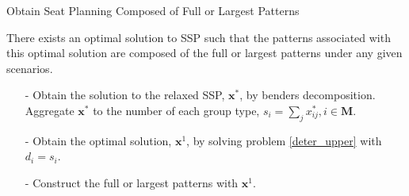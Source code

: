 \begin{frame}{Obtain Seat Planning Composed of Full or Largest Patterns}

  There exists an optimal solution to SSP such that the patterns associated with this optimal solution are composed of the full or largest patterns under any given scenarios.

  \begin{itemize}
    \item[-] Obtain the solution to the relaxed SSP, $\mathbf{x}^{*}$, by benders decomposition. Aggregate $\mathbf{x}^{*}$ to the number of each group type, ${s}_{i} =\sum_{j} x^{*}_{ij}, i \in \mathbf{M}$.

    \item[-] Obtain the optimal solution, $\mathbf{x}^{1}$, by solving problem \eqref{deter_upper} with $d_{i} = {s}_{i}$. 
     
    \item[-] Construct the full or largest patterns with $\mathbf{x}^{1}$.
 \end{itemize}
\end{frame}
